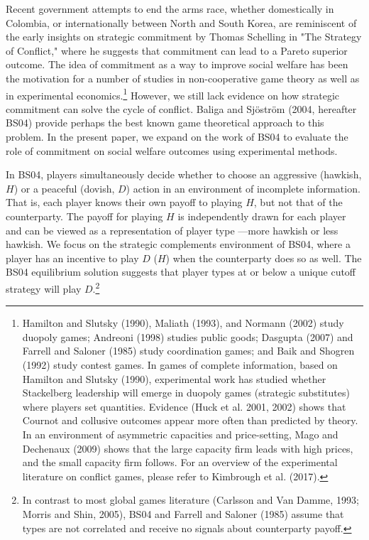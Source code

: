 \documentclass[12pt,english]{article}
\begin{document}
Recent government attempts to end the arms race, whether domestically in Colombia, or internationally between North and South Korea, are reminiscent of the early insights on strategic commitment by Thomas Schelling in "The Strategy of Conflict," where he suggests that commitment can lead to a Pareto superior outcome. The idea of commitment as a way to improve social welfare has been the motivation for a number of studies in non-cooperative game theory as well as in experimental economics.\footnote{Hamilton and Slutsky (1990), Maliath (1993),  and Normann (2002) study duopoly games; Andreoni (1998) studies public goods;  Dasgupta (2007) and Farrell and Saloner (1985) study coordination games; and Baik and Shogren (1992) study contest games.  In games of complete information, based on Hamilton and Slutsky (1990), experimental work has studied whether Stackelberg leadership will emerge in duopoly games (strategic substitutes) where players set quantities. Evidence (Huck et al. 2001, 2002) shows that Cournot and collusive outcomes appear more often than predicted by theory. In an environment of asymmetric capacities and price-setting, Mago and Dechenaux (2009) shows that the large capacity firm leads with high prices, and the small capacity firm follows. For an overview of the experimental literature on conflict games, please refer to Kimbrough et  al. (2017). }  However, we still lack evidence on how strategic commitment can solve the cycle of conflict. Baliga and Sj\"ostr\"om (2004, hereafter BS04) provide perhaps the best known game theoretical approach to this problem. In the present paper, we expand on the work of BS04 to evaluate the role of commitment on social welfare outcomes using experimental methods.  


In BS04, players simultaneously decide whether to choose an aggressive (hawkish, $H$) or a peaceful (dovish, $D$) action in an environment of incomplete information. That is, each player knows their own payoff to playing $H$, but not that of the counterparty. The payoff for playing $H$ is independently drawn for each player and can be viewed as a representation of player type ---more hawkish or less hawkish. We focus on the strategic complements environment of BS04, where a player has an incentive to play $D$ ($H$) when the counterparty does so as well. The BS04 equilibrium solution suggests that player types at or below a unique cutoff strategy will play $D$.\footnote{In contrast to most global games literature (Carlsson and Van Damme, 1993; Morris and Shin, 2005), BS04 and Farrell and Saloner (1985) assume that types are not correlated and receive no signals about counterparty payoff. }
\end{document}

